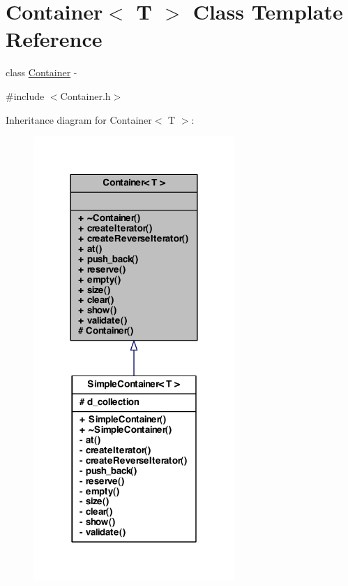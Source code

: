 \hypertarget{class_container}{
\section{Container$<$ T $>$ Class Template Reference}
\label{class_container}
}


class \hyperlink{class_container}{Container} -\/  




{\ttfamily \#include $<$Container.h$>$}



Inheritance diagram for Container$<$ T $>$:\nopagebreak
\begin{figure}[H]
\begin{center}
\leavevmode
\includegraphics[width=216pt]{class_container__inherit__graph}
\end{center}
\end{figure}
